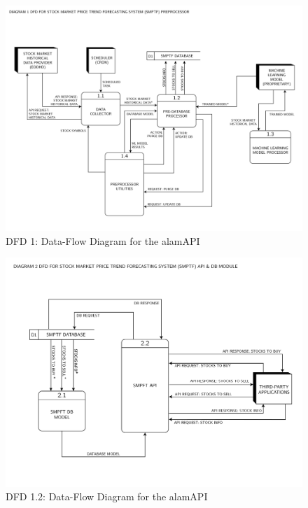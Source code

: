 \begin{figure}
    \centering
    \includegraphics[width=1\textwidth]{./assets/Data Flow Diagram-03.png}
    \caption{DFD 1: Data-Flow Diagram for the alamAPI}
    \label{fig:dfd1}
\end{figure}

\begin{figure}
    \centering
    \includegraphics[width=1\textwidth]{./assets/Data Flow Diagram-04.png}
    \caption{DFD 1.2: Data-Flow Diagram for the alamAPI}
    \label{fig:dfd1.2}
\end{figure}

